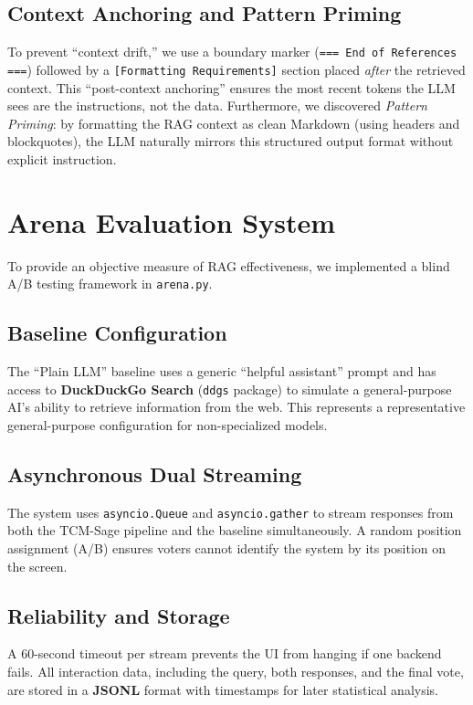 \subsection{Context Anchoring and Pattern Priming}
To prevent ``context drift,'' we use a boundary marker (\texttt{=== End of References ===}) followed by a \texttt{[Formatting Requirements]} section placed \textit{after} the retrieved context. This ``post-context anchoring'' ensures the most recent tokens the LLM sees are the instructions, not the data. Furthermore, we discovered \textit{Pattern Priming}: by formatting the RAG context as clean Markdown (using headers and blockquotes), the LLM naturally mirrors this structured output format without explicit instruction.

\section{Arena Evaluation System}

To provide an objective measure of RAG effectiveness, we implemented a blind A/B testing framework in \texttt{arena.py}.

\subsection{Baseline Configuration}
The ``Plain LLM'' baseline uses a generic ``helpful assistant'' prompt and has access to \textbf{DuckDuckGo Search} (\texttt{ddgs} package) to simulate a general-purpose AI's ability to retrieve information from the web. This represents a representative general-purpose configuration for non-specialized models.

\subsection{Asynchronous Dual Streaming}
The system uses \texttt{asyncio.Queue} and \texttt{asyncio.gather} to stream responses from both the TCM-Sage pipeline and the baseline simultaneously. A random position assignment (A/B) ensures voters cannot identify the system by its position on the screen.

\subsection{Reliability and Storage}
A 60-second timeout per stream prevents the UI from hanging if one backend fails. All interaction data, including the query, both responses, and the final vote, are stored in a \textbf{JSONL} format with timestamps for later statistical analysis.

